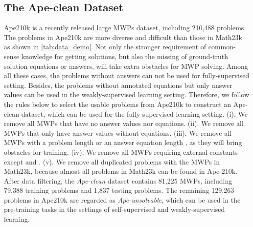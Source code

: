 \documentclass[11pt]{article}
\begin{document}
\subsection{The Ape-clean Dataset}


Ape210k is a recently released large MWPs dataset, including 210,488 problems. 
The problems in Ape210k are more diverse and difficult than those in Math23k as shown in \ref{tab:data_demo}. Not only the stronger requirement of common-sense knowledge for getting solutions, but also the missing of ground-truth solution equations or answers, will take extra obstacles for MWP solving. Among all these cases, 
the problems without answers can not be used for fully-supervised setting. Besides, the problems without annotated equations but only answer values
can be used in the weakly-supervised learning setting. 
Therefore, we follow the rules below to select the usable problems from Ape210k to construct an Ape-clean dataset, which can be used for the fully-supervised learning setting. (i). We remove all MWPs that  have no answer values nor equations.
(ii). We remove all MWPs that only have answer values without equations. 
(iii). We remove all MWPs with a problem length  or an answer equation length , as they will bring obstacles for training. (iv). We remove all MWPs requiring external constants except  and .
(v). We remove all duplicated problems with the MWPs in Math23k, because almost all problems in Math23k can be found in Ape-210k.
After data filtering, the \emph{Ape-clean} dataset contains 81,225 MWPs, including 79,388 training problems and 1,837 testing problems. The remaining 129,263 problems in Ape210k are regarded as \emph{Ape-unsolvable}, which can be used in the pre-training tasks in the settings of self-supervised and weakly-supervised learning. 
\end{document}
